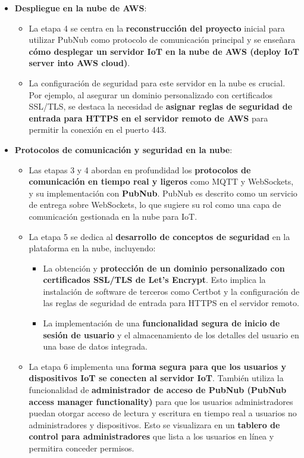 \documentclass{report}
\begin{document}
\begin{itemize}
    \item \textbf{Despliegue en la nube de AWS}:
    \begin{itemize}
        \item La etapa 4 se centra en la \textbf{reconstrucción del proyecto} inicial para utilizar PubNub como protocolo de 
        comunicación principal y se enseñara \textbf{cómo desplegar un servidor IoT en la nube de AWS (deploy IoT server into AWS cloud)}.
        \item La configuración de seguridad para este servidor en la nube es crucial. Por ejemplo, al asegurar un dominio 
        personalizado con certificados SSL/TLS, se destaca la necesidad de \textbf{asignar reglas de seguridad de entrada para HTTPS 
        en el servidor remoto de AWS} para permitir la conexión en el puerto 443.
    \end{itemize}

    \item \textbf{Protocolos de comunicación y seguridad en la nube}:
    \begin{itemize}
        \item Las etapas 3 y 4 abordan en profundidad los \textbf{protocolos de comunicación en tiempo real y ligeros} como MQTT 
        y WebSockets, y su implementación con \textbf{PubNub}. PubNub es descrito como un servicio de entrega sobre WebSockets, lo 
        que sugiere su rol como una capa de comunicación gestionada en la nube para IoT.
        \item La etapa 5 se dedica al \textbf{desarrollo de conceptos de seguridad} en la plataforma en la nube, incluyendo:
        \begin{itemize}
            \item La obtención y \textbf{protección de un dominio personalizado con certificados SSL/TLS de Let's Encrypt}. Esto 
            implica la instalación de software de terceros como Certbot y la configuración de las reglas de seguridad de entrada 
            para HTTPS en el servidor remoto.
            \item La implementación de una \textbf{funcionalidad segura de inicio de sesión de usuario} y el almacenamiento de los 
            detalles del usuario en una base de datos integrada.
        \end{itemize}
        \item La etapa 6 implementa una \textbf{forma segura para que los usuarios y dispositivos IoT se conecten al servidor IoT}. 
        También utiliza la funcionalidad de \textbf{administrador de acceso de PubNub (PubNub access manager functionality)} para 
        que los usuarios administradores puedan otorgar acceso de lectura y escritura en tiempo real a usuarios no administradores 
        y dispositivos. Esto se visualizara en un \textbf{tablero de control para administradores} que lista a los usuarios en línea 
        y permitira conceder permisos.
    \end{itemize}
\end{itemize}
\end{document}

